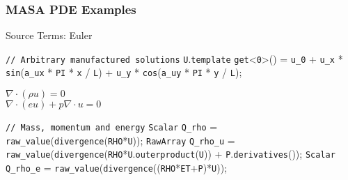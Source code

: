 \documentclass[mathserif]{beamer}
\newcommand{\data}[1]{\texttt{\color{DarkRed}#1}}
\newcommand{\comment}[1]{\texttt{\color{Red}#1}}
\newcommand{\type}[1]{\texttt{\color{DarkGreen}#1}}
\newcommand{\var}[1]{\texttt{\color{Blue}#1}}
\newcommand{\func}[1]{\texttt{\color{DarkCyan}#1}}
\newcommand{\key}[1]{\texttt{\color{Purple}#1}}
\begin{document}
\begin{frame}[fragile]
\frametitle{MASA PDE Examples}

\begin{block}{Source Terms: Euler}
\begin{semiverbatim}
\footnotesize
\comment{// Arbitrary manufactured solutions}
\var{U}.\key{template} \func{get}<\data{0}>() = \var{u_0} + \var{u_x} * \func{sin}(\var{a_ux} * \var{PI} * \var{x} / \var{L}) 
                          + \var{u_y} * \func{cos}(\var{a_uy} * \var{PI} * \var{y} / \var{L}); 
\end{semiverbatim}

 \begin{center}
  $\nabla \cdot (\rho u ) = 0$ \\
  \vspace{15pt}
  $\nabla \cdot (e u) + p \nabla \cdot u = 0$
  \end{center}
\begin{semiverbatim}
\footnotesize

\comment{// Mass, momentum and energy}
\type{Scalar}   \var{Q_rho}   = \func{raw_value}(\func{divergence}(\var{RHO}*\var{U}));
\type{RawArray} \var{Q_rho_u} = \func{raw_value}(\func{divergence}(\var{RHO}*\var{U}.\func{outerproduct}(\var{U})) +
                   \var{P}.\func{derivatives}());
 \type{Scalar}  \var{Q_rho_e} = \func{raw_value}(\func{divergence}((\var{RHO}*\var{ET}+\var{P})*\var{U}));

\end{semiverbatim}
\end{block}
\end{frame}



 
\end{document}
